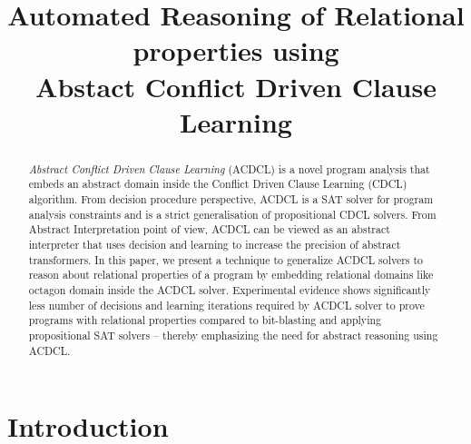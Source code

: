 \documentclass[a4paper,conference]{llncs}
\begin{document}
\title{Automated Reasoning of Relational properties using \\
Abstact Conflict Driven Clause Learning}
\maketitle
\begin{abstract}
%
{\em Abstract Conflict Driven Clause Learning} (ACDCL) is a novel program analysis that embeds an 
abstract domain inside the Conflict Driven Clause Learning (CDCL) algorithm. From decision procedure 
perspective, ACDCL is a SAT solver for program analysis constraints and is a strict generalisation of 
propositional CDCL solvers. From Abstract Interpretation point of view, ACDCL can be viewed as an 
abstract interpreter that uses decision and learning to increase the precision of abstract transformers. 
In this paper, we present a technique to generalize ACDCL solvers to reason about relational properties 
of a program by embedding relational domains like octagon domain inside the ACDCL solver.  Experimental 
evidence shows significantly less number of decisions and learning iterations required by ACDCL solver to 
prove programs with relational properties compared to bit-blasting and applying propositional SAT solvers -- 
thereby emphasizing the need for abstract reasoning using ACDCL. 
%
\end{abstract}

\section{Introduction}
\end{document}
